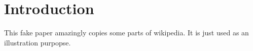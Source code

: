 \section{Introduction}
\label{sec:intro}

This fake paper amazingly copies some parts of wikipedia.
It is just used as an illustration purpopse.



